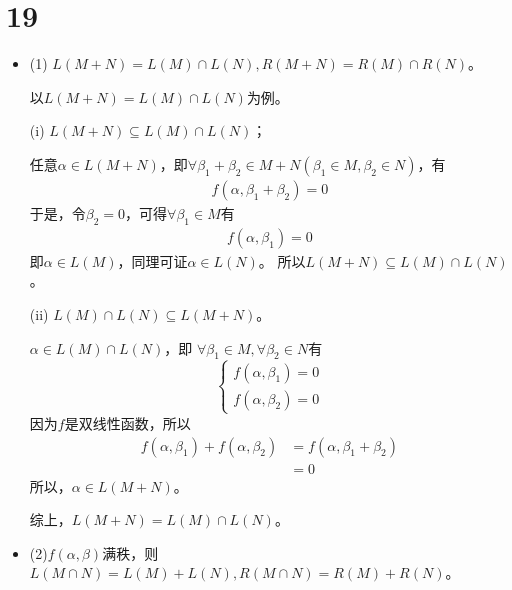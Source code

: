 \documentclass{article}
\begin{document}
\section*{19}

\begin{itemize}
  \item (1) $L(M + N) = L(M) \cap L(N), R(M + N) = R(M) \cap R(N)$。

        以$L(M + N) = L(M) \cap L(N)$为例。

        (i) $L(M + N) \subseteq L(M) \cap L(N)$；

        任意$\alpha \in L(M + N)$，即$\forall \beta_1 + \beta_2 \in M + N (\beta_1 \in M, \beta_2 \in N)$，有
        \begin{align*}
          f(\alpha, \beta_1 + \beta_2) = 0
        \end{align*}
        于是，令$\beta_2 = 0$，可得$\forall \beta_1 \in M$有
        \begin{align*}
          f(\alpha, \beta_1) = 0
        \end{align*}
        即$\alpha \in L(M)$，同理可证$\alpha \in L(N)$。
        所以$L(M + N) \subseteq L(M) \cap L(N)$。

        (ii) $L(M) \cap L(N) \subseteq L(M + N)$。

        $\alpha \in L(M) \cap L(N)$，即
        $\forall \beta_1 \in M, \forall \beta_2 \in N$有
        \begin{equation*}
          \begin{cases*}
            f(\alpha, \beta_1) = 0 \\
            f(\alpha, \beta_2) = 0
          \end{cases*}
        \end{equation*}
        因为$f$是双线性函数，所以
        \begin{align*}
          f(\alpha, \beta_1) + f(\alpha, \beta_2)
           & = f(\alpha, \beta_1 + \beta_2) \\
           & = 0
        \end{align*}
        所以，$\alpha \in L(M + N)$。

        综上，$L(M + N) = L(M) \cap L(N)$。

  \item (2)$f(\alpha, \beta)$满秩，则$L(M \cap N) = L(M) + L(N), R(M \cap N) = R(M) + R(N)$。


\end{itemize}
\end{document}
